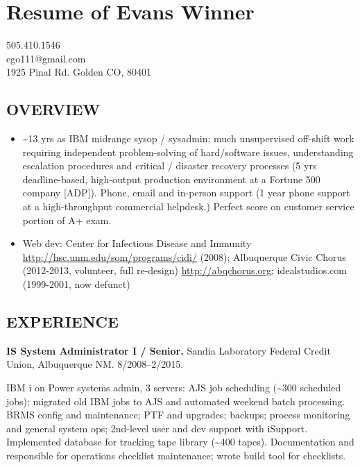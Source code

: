 \documentclass[utopia,letterpaper,10pt,microtype,paralist]{article}
\date{\today}
\title{}
\begin{document}
\section*{Resume of Evans Winner}
\label{sec-1}

\begin{center}
505.410.1546 \\
ego111@gmail.com \\
1925 Pinal Rd. Golden CO, 80401
\end{center}

\subsection*{OVERVIEW}
\label{sec-1-1}

\begin{itemize}
\item \textasciitilde{}13 yrs as IBM midrange sysop / sysadmin; much unsupervised
off-shift work requiring independent problem-solving of
hard/software issues, understanding escalation procedures and
critical / disaster recovery processes (5 yrs deadline-based,
high-output production environment at a Fortune 500 company [ADP]).
Phone, email and in-person support (1 year phone support at a
high-throughput commercial helpdesk.) Perfect score on customer
service portion of A+ exam.
\item Web dev: Center for Infectious Disease and Immunity
\url{http://hsc.unm.edu/som/programs/cidi/} (2008); Albuquerque Civic
Chorus (2012-2013, volunteer, full re-design)
\url{http://abqchorus.org}; idealstudios.com (1999-2001, now defunct)
\end{itemize}

\subsection*{EXPERIENCE}
\label{sec-1-2}

\textbf{IS System Administrator I / Senior.} Sandia Laboratory Federal Credit
 Union, Albuquerque NM. 8/2008--2/2015.

IBM i on Power systems admin, 3 servers: AJS job
scheduling (\textasciitilde{}300 scheduled jobs); migrated old IBM jobs to AJS
and automated weekend batch processing. BRMS config and
maintenance; PTF and upgrades; backups; process monitoring and
general system ops; 2nd-level user and dev support with
iSupport.  Implemented database for tracking
tape library (\textasciitilde{}400 tapes).  Documentation and responsible for
operations checklist maintenance; wrote build tool for
checklists.
\end{document}
